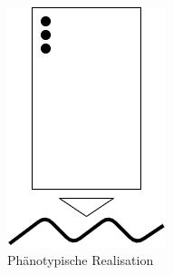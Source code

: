 \begin{figure}[!htb]
	\centering
	\includegraphics[scale=0.5]{img/rechenberg_notation/phaenotypische_realisation.png}
	\caption{Phänotypische Realisation}
\label{fig:phaenotypische_realisation}
\end{figure}


